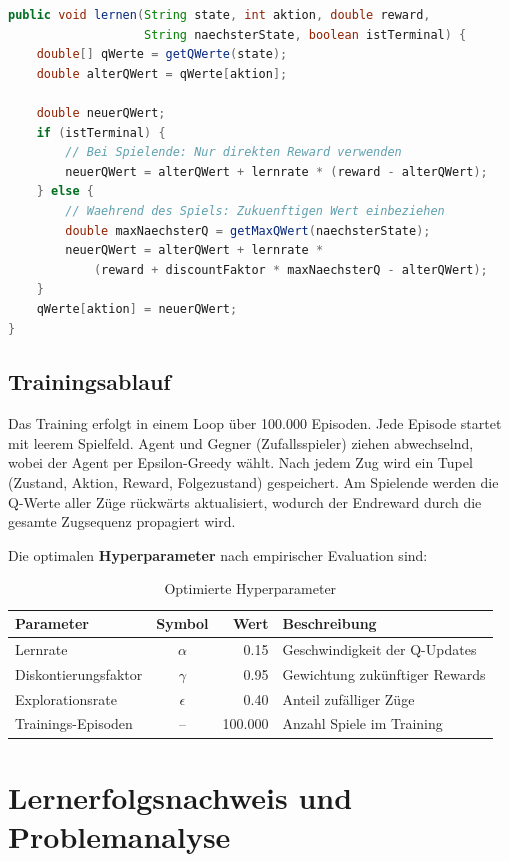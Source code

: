 \begin{lstlisting}[language=Java, caption={Q-Learning Update-Methode}]
public void lernen(String state, int aktion, double reward, 
                   String naechsterState, boolean istTerminal) {
    double[] qWerte = getQWerte(state);
    double alterQWert = qWerte[aktion];
    
    double neuerQWert;
    if (istTerminal) {
        // Bei Spielende: Nur direkten Reward verwenden
        neuerQWert = alterQWert + lernrate * (reward - alterQWert);
    } else {
        // Waehrend des Spiels: Zukuenftigen Wert einbeziehen
        double maxNaechsterQ = getMaxQWert(naechsterState);
        neuerQWert = alterQWert + lernrate * 
            (reward + discountFaktor * maxNaechsterQ - alterQWert);
    }
    qWerte[aktion] = neuerQWert;
}
\end{lstlisting}

\subsection{Trainingsablauf}

Das Training erfolgt in einem Loop über 100.000 Episoden. Jede Episode startet mit leerem Spielfeld. Agent und Gegner (Zufallsspieler) ziehen abwechselnd, wobei der Agent per Epsilon-Greedy wählt. Nach jedem Zug wird ein Tupel (Zustand, Aktion, Reward, Folgezustand) gespeichert. Am Spielende werden die Q-Werte aller Züge rückwärts aktualisiert, wodurch der Endreward durch die gesamte Zugsequenz propagiert wird.

Die optimalen \textbf{Hyperparameter} nach empirischer Evaluation sind:

\begin{table}[H]
\centering
\begin{tabular}{l|c|r|l}
\textbf{Parameter} & \textbf{Symbol} & \textbf{Wert} & \textbf{Beschreibung} \\
\hline
Lernrate & $\alpha$ & 0.15 & Geschwindigkeit der Q-Updates \\
Diskontierungsfaktor & $\gamma$ & 0.95 & Gewichtung zukünftiger Rewards \\
Explorationsrate & $\epsilon$ & 0.40 & Anteil zufälliger Züge \\
Trainings-Episoden & -- & 100.000 & Anzahl Spiele im Training \\
\end{tabular}
\caption{Optimierte Hyperparameter}
\end{table}


\section{Lernerfolgsnachweis und Problemanalyse}

